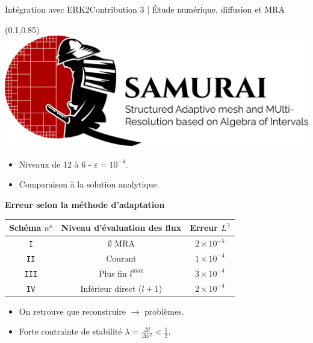 \begin{frame}{Intégration avec ERK2}{Contribution 3 | Étude numérique, diffusion et MRA}
    \begin{textblock*}{40pt}(0.1\paperwidth,0.85\paperheight)
        \includegraphics[scale=.03]{medias/2_/1_/light_logo.png}
    \end{textblock*}
    \begin{itemize}
        \item Niveaux de 12 à 6 - $\varepsilon = 10^{-4}$.
        \item Comparaison à la solution analytique.
    \end{itemize}\pause
    \begin{center}
        \textbf{\large{\color{Primary}Erreur selon la méthode d'adaptation}}
        \begin{tabular}
            {|c|c|c|}\hline Schéma $n^o$ & Niveau d'évaluation des flux & Erreur $L^2$ \\\hline\texttt{I} & $\emptyset$ MRA & $2 \times 10^{-5}$ \\\texttt{II} & Courant & $1 \times 10^{-4}$ \\\texttt{III} & Plus fin $l^{\max}$& $3 \times 10^{-4}$ \\\texttt{IV} & Inférieur direct ($l+1$) & $2 \times 10^{-4}$ \\\hline
        \end{tabular}
    \end{center}
    \pause 
    \begin{itemize}
        \item On retrouve que reconstruire $\rightarrow$ problèmes.
        \item Forte contrainte de stabilité $\lambda = \frac{\Delta t}{ \Delta x^2 } < \frac{1}{2}$.
    \end{itemize}
\end{frame}